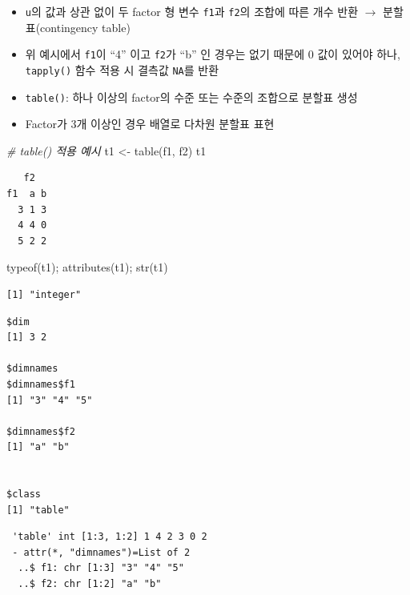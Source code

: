 \documentclass[
  11pt,
]{krantz}
\newenvironment{Shaded}{\begin{snugshade}}{\end{snugshade}}
\newcommand{\CommentTok}[1]{\textcolor[rgb]{0.37,0.37,0.37}{\textit{#1}}}
\newcommand{\FunctionTok}[1]{\textcolor[rgb]{0,0,0}{#1}}
\newcommand{\NormalTok}[1]{#1}
\newcommand{\OtherTok}[1]{\textcolor[rgb]{0.37,0.37,0.37}{#1}}
\providecommand{\tightlist}{%
  \setlength{\itemsep}{0pt}\setlength{\parskip}{0pt}}
\begin{document}
\normalsize

\begin{itemize}
\tightlist
\item
  \texttt{u}의 값과 상관 없이 두 factor 형 변수 \texttt{f1}과 \texttt{f2}의 조합에 따른 개수 반환 \(\rightarrow\) 분할표(contingency table)
\item
  위 예시에서 \texttt{f1}이 ``4'' 이고 \texttt{f2}가 ``b'' 인 경우는 없기 때문에 0 값이 있어야 하나, \texttt{tapply()} 함수 적용 시 결측값 \texttt{NA}를 반환
\item
  \texttt{table()}: 하나 이상의 factor의 수준 또는 수준의 조합으로 분할표 생성
\item
  Factor가 3개 이상인 경우 배열로 다차원 분할표 표현
\end{itemize}

\footnotesize

\begin{Shaded}
\begin{Highlighting}[]
\CommentTok{\# table() 적용 예시}
\NormalTok{t1 }\OtherTok{\textless{}{-}} \FunctionTok{table}\NormalTok{(f1, f2)}
\NormalTok{t1}
\end{Highlighting}
\end{Shaded}

\begin{verbatim}
   f2
f1  a b
  3 1 3
  4 4 0
  5 2 2
\end{verbatim}

\begin{Shaded}
\begin{Highlighting}[]
\FunctionTok{typeof}\NormalTok{(t1); }\FunctionTok{attributes}\NormalTok{(t1); }\FunctionTok{str}\NormalTok{(t1)}
\end{Highlighting}
\end{Shaded}

\begin{verbatim}
[1] "integer"
\end{verbatim}

\begin{verbatim}
$dim
[1] 3 2

$dimnames
$dimnames$f1
[1] "3" "4" "5"

$dimnames$f2
[1] "a" "b"


$class
[1] "table"
\end{verbatim}

\begin{verbatim}
 'table' int [1:3, 1:2] 1 4 2 3 0 2
 - attr(*, "dimnames")=List of 2
  ..$ f1: chr [1:3] "3" "4" "5"
  ..$ f2: chr [1:2] "a" "b"
\end{verbatim}
\end{document}
